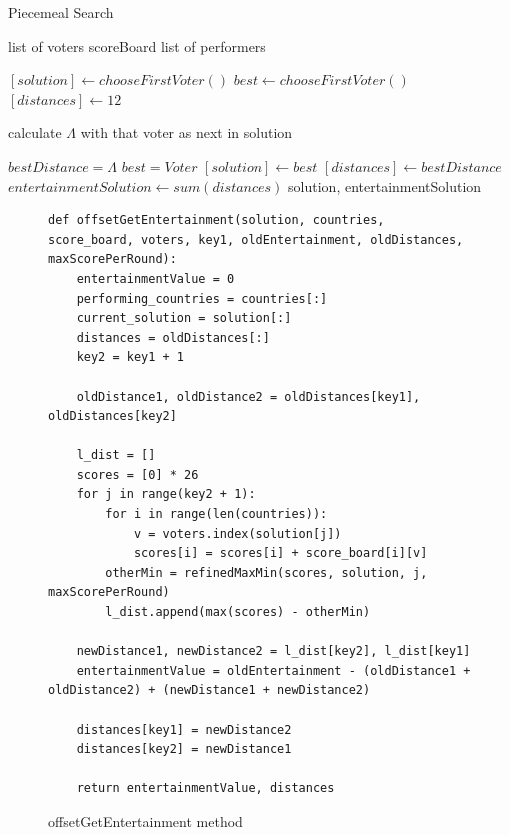 \documentclass[12pt]{report}
\begin{document}
\begin{algorithm}
\caption{Piecemeal Search}
\label{piecemealPseudocode}
\begin{algorithmic}[1]
\REQUIRE list of voters
\REQUIRE scoreBoard
\REQUIRE list of performers

\STATE $[solution] \leftarrow chooseFirstVoter()$
\STATE $best \leftarrow chooseFirstVoter()$
\STATE $[distances] \leftarrow 12$

\STATE calculate $\Lambda$ with that voter as next in solution

\STATE $bestDistance= \Lambda$
\STATE $best = Voter$
\ENDIF
\ENDFOR
\STATE $[solution] \leftarrow best$
\STATE $[distances] \leftarrow bestDistance$
\ENDFOR
\STATE $entertainmentSolution \leftarrow sum(distances)$
\RETURN solution, entertainmentSolution
\end{algorithmic}
\end{algorithm}

\begin{figure}[H]
\caption{offsetGetEntertainment method}
\label{offsetGetEntertainment}
\begin{lstlisting}
def offsetGetEntertainment(solution, countries, score_board, voters, key1, oldEntertainment, oldDistances, maxScorePerRound):
    entertainmentValue = 0
    performing_countries = countries[:]
    current_solution = solution[:]
    distances = oldDistances[:]
    key2 = key1 + 1

    oldDistance1, oldDistance2 = oldDistances[key1], oldDistances[key2]

    l_dist = []
    scores = [0] * 26
    for j in range(key2 + 1):
        for i in range(len(countries)):
            v = voters.index(solution[j])
            scores[i] = scores[i] + score_board[i][v]
        otherMin = refinedMaxMin(scores, solution, j, maxScorePerRound)
        l_dist.append(max(scores) - otherMin)
    
    newDistance1, newDistance2 = l_dist[key2], l_dist[key1]
    entertainmentValue = oldEntertainment - (oldDistance1 + oldDistance2) + (newDistance1 + newDistance2)
    
    distances[key1] = newDistance2
    distances[key2] = newDistance1
    
    return entertainmentValue, distances
\end{lstlisting}
\end{figure}
\end{document}
